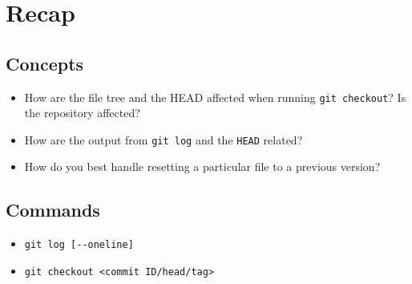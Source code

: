 \documentclass[../main/git_course_main.tex]{subfiles}
\begin{document}
\newpage
\section{Recap}

\subsection{Concepts}

\begin{itemize}
	\item How are the file tree and the HEAD affected when running \verb$git checkout$? Is the repository affected?
	\item How are the output from \verb$git log$ and the \verb$HEAD$ related?
	\item How do you best handle resetting a particular file to a previous version?
\end{itemize}

\subsection{Commands}

\begin{itemize}
	\item \verb$git log [--oneline]$
	\item \verb$git checkout <commit ID/head/tag>$
\end{itemize}
\end{document}
